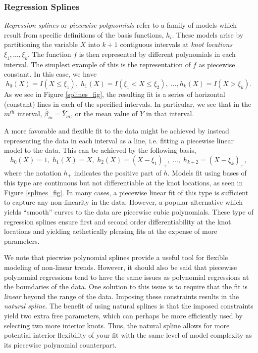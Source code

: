 \subsubsection{Regression Splines}

\emph{Regression splines} or \emph{piecewise polynomials} refer to a
family of models which result from specific definitions of the basis
functions, $h_i$. These models arise by partitioning the variable $X$
into $k+1$ contiguous intervals at \emph{knot locations} $\xi_1,
\dots, \xi_{k}$. The function $f$ is then represented by different
polynomials in each interval. The simplest example of this is the
representation of $f$ as piecewise constant. In this case, we have
	\[h_0(X) = I(X \leq \xi_1),\; h_1(X)=I(\xi_1 < X \leq \xi_2), \; \dots, h_{k}(X) = I(X > \xi_k).  \]
As we see in Figure \ref{splines_fig}, the resulting fit is a series
of horizontal (constant) lines in each of the specified intervals. In
particular, we see that in the $m^{th}$ interval, $\hat{\beta}_m =
\bar{Y}_m$, or the mean value of $Y$ in that interval.

A more favorable and flexible fit to the data might be achieved by
instead representing the data in each interval as a line, i.e. fitting
a piecewise linear model to the data. This can be achieved by the
following basis,
	\[h_0(X) = 1,\; h_1(X) = X,\; h_2(X) = (X- \xi_1)_+,\; \dots,\; h_{k+2}=(X-\xi_k)_+,\]
where the notation $h_+$ indicates the positive part of $h$. Models
fit using bases of this type are continuous but not differentiable at
the knot locations, as seen in Figure \ref{splines_fig}. In many
cases, a piecewise linear fit of this type is sufficient to capture
any non-linearity in the data. However, a popular alternative which
yields ``smooth'' curves to the data are piecewise cubic
polynomials. These type of regression splines ensure first and second
order differentiability at the knot locations and yielding
aethetically pleasing fits at the expense of more parameters.

We note that piecwise polynomial splines provide a useful tool for
flexible modeling of non-linear trends. However, it should also be
said that piecewise polynomial regressions tend to have the same
issues as polynomial regressions at the boundaries of the data. One
solution to this issue is to require that the fit is \emph{linear}
beyond the range of the data. Imposing these constraints results in
the \emph{natural spline}. The benefit of using natural splines is
that the imposed constraints yield two extra free parameters, which
can perhaps be more efficiently used by selecting two more interior
knots. Thus, the natural spline allows for more potential interior
flexibility of your fit with the same level of model complexity as its
piecewise polynomial counterpart.

